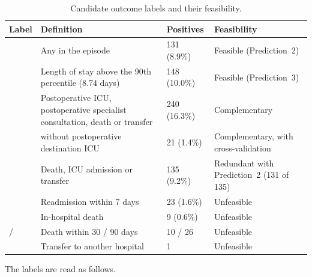 \begin{table}[htbp]
\centering
\caption{Candidate outcome labels and their feasibility.}
\label{tab:etiquetas}
\small
\begin{tabular}{L{4.6cm}L{4.6cm}L{1.9cm}L{2.5cm}}
\toprule
Label & Definition & Positives & Feasibility \\
\midrule
{} & Any  in the episode & 131 (8.9\%) & Feasible (Prediction~2) \\
 & Length of stay above the 90th percentile (8.74 days) & 148 (10.0\%) & Feasible (Prediction~3) \\
 & Postoperative ICU, postoperative specialist consultation, death or transfer & 240 (16.3\%) & Complementary \\
 &  without postoperative destination ICU & 21 (1.4\%) & Complementary, with cross-validation \\
 & Death, ICU admission or transfer & 135 (9.2\%) & Redundant with Prediction~2 (131 of 135) \\
 & Readmission within 7 days & 23 (1.6\%) & Unfeasible \\
 & In-hospital death & 9 (0.6\%) & Unfeasible \\
 /  & Death within 30 / 90 days & 10 / 26 & Unfeasible \\
 & Transfer to another hospital & 1 & Unfeasible \\
\bottomrule
\end{tabular}
\end{table}

The labels are read as follows.

